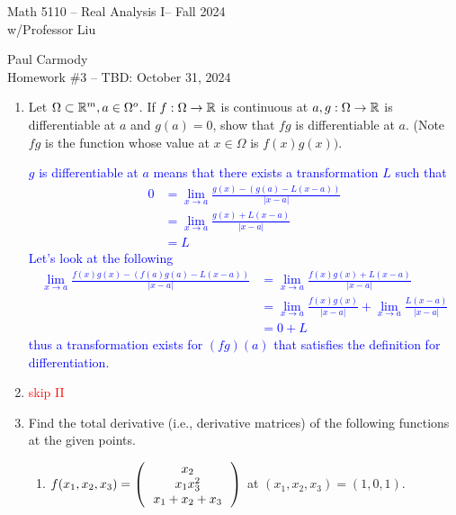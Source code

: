\documentclass[10pt,a4paper]{report}
\newcommand{\CLASSNAME}{Math 5110 -- Real Analysis I}
\newcommand{\STUDENTNAME}{Paul Carmody}
\newcommand{\ASSIGNMENT}{Homework \#3 }
\newcommand{\DUEDATE}{TBD: October 31, 2024}
\newcommand{\SEMESTER}{Fall 2024}
\newcommand{\RED}[1]{\textcolor{red}{#1}}
\newcommand{\BLUE}[1]{\textcolor{blue}{#1}}
\begin{document}
\begin{center}
	\Large{\CLASSNAME -- \SEMESTER} \\
	\large{ w/Professor Liu}
\end{center}
\begin{center}
	\STUDENTNAME \\
	\ASSIGNMENT -- \DUEDATE\\
\end{center} 

\begin{enumerate}[label=\Roman*.]
\item Let $\Omega \subset \mathbb{R}^m, a \in \Omega^o$.  If $f:\Omega \to \mathbb{R}$ is continuous at $a, g: \Omega \to \mathbb{R}$ is differentiable at $a$ and $g(a) = 0$, show that $fg$ is differentiable at $a$.  (Note $fg$ is the function whose value at $x \in \Omega$ is $f(x)g(x))$.

\BLUE{$g$ is differentiable at $a$ means that there exists a transformation $L$ such that 
\begin{align*}
	0 &= \lim_{x \to a} \frac{g(x) - (g(a)-L(x-a))}{|x-a|} \\
	&= \lim_{x \to a} \frac{g(x) + L(x-a)}{|x-a|} \\
	&= L 
\end{align*}Let's look at the following
\begin{align*}
	\lim_{x \to a} \frac{f(x)g(x) - (f(a)g(a)-L(x-a))}{|x-a|} &= \lim_{x \to a} \frac{f(x)g(x) + L(x-a)}{|x-a|} \\
	&= \lim_{x \to a} \frac{f(x)g(x)}{|x-a|} + \lim_{x\to a} \frac{L(x-a)}{|x-a|} \\
	&= 0 + L
\end{align*}thus a transformation exists for $(fg)(a)$ that satisfies the definition for differentiation.
}

\item \RED{skip II}

\newpage
\item Find the total derivative (i.e., derivative matrices) of the following functions at the given points.
\begin{enumerate}[label=(\alph*)]
	\item $f(x_1,x_2,x_3) = \left (\, \begin{array}{c}
		x_2 \\ 
		x_1x_3^2 \\
		x_1+x_2+x_3
	\end{array}  \,\right )$ at $(x_1,x_2,x_3) = (1,0,1)$.
	

\end{enumerate}
\end{enumerate}
\end{document}
